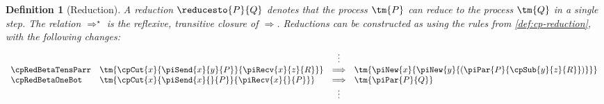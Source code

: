 \documentclass[submission,copyright,creativecommons]{eptcs}
\newtheorem{definition}{Definition}
\begin{document}
\begin{definition}[Reduction]\label{def:hcp-reduction}
  A reduction $\reducesto{P}{Q}$ denotes that the process $\tm{P}$ can reduce
  to the process $\tm{Q}$ in a single step.
  The relation $\Longrightarrow^\star$ is the reflexive, transitive closure of
  $\Longrightarrow$.
  Reductions can be constructed as using the rules from \cref{def:cp-reduction},
  with the following changes:
  \begin{gather*}
    \begin{array}{llcll}
      &
      & \vdots
      &
      \\
      \cpRedBetaTensParr
      & \tm{\cpCut{x}{\piSend{x}{y}{P}}{\piRecv{x}{z}{R}}}
      & \Longrightarrow
      & \tm{\piNew{x}{\piNew{y}{(\piPar{P}{\cpSub{y}{z}{R}})}}}
      \\
      \cpRedBetaOneBot
      & \tm{\cpCut{x}{\piSend{x}{}{P}}{\piRecv{x}{}{P}}}
      & \Longrightarrow
      & \tm{\piPar{P}{Q}}
      \\
      &
      & \vdots
      &
    \end{array}
  \end{gather*}
  \begin{center}
    \begin{prooftree*}
      \SYM{\hccpRedGammaNew}
    \end{prooftree*}
    \begin{prooftree*}
      \SYM{\hccpRedGammaMix}
    \end{prooftree*}
    \begin{prooftree*}
      \SYM{\hccpRedGammaEquiv}
    \end{prooftree*}
  \end{center}
\end{definition}
\end{document}
